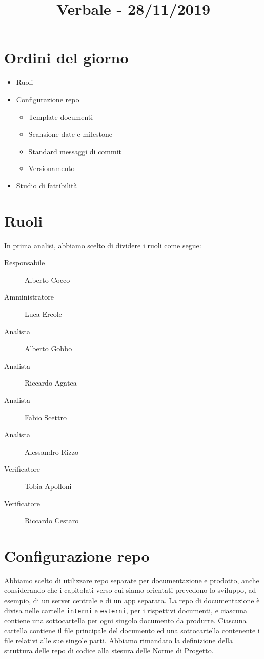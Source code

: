 \documentclass{article}
\title{Verbale - 28/11/2019} %
\newcommand{\commons}{../../commons}
\begin{document}


\section{Ordini del giorno}
\label{sec:ordini_del_giorno}

\begin{itemize}
  \item Ruoli
  \item Configurazione repo
        \begin{itemize}
          \item Template documenti
          \item Scansione date e milestone
          \item Standard messaggi di commit
          \item Versionamento
        \end{itemize}
  \item Studio di fattibilità
\end{itemize}

\section{Ruoli}
\label{sec:ruoli}

In prima analisi, abbiamo scelto di dividere i ruoli come segue:

\begin{description}
  \item[Responsabile] Alberto Cocco
  \item[Amministratore] Luca Ercole
  \item[Analista] Alberto Gobbo
  \item[Analista] Riccardo Agatea
  \item[Analista] Fabio Scettro
  \item[Analista] Alessandro Rizzo
  \item[Verificatore] Tobia Apolloni
  \item[Verificatore] Riccardo Cestaro
\end{description}

\section{Configurazione repo}
\label{sec:configurazione_repo}

Abbiamo scelto di utilizzare repo separate per documentazione e prodotto, anche considerando che i capitolati verso cui siamo orientati prevedono lo sviluppo, ad esempio, di un server centrale e di un app separata.
La repo di documentazione è divisa nelle cartelle \verb|interni| e \verb|esterni|, per i rispettivi documenti, e ciascuna contiene una sottocartella per ogni singolo documento da produrre.
Ciascuna cartella contiene il file principale del documento ed una sottocartella contenente i file relativi alle sue singole parti.
Abbiamo rimandato la definizione della struttura delle repo di codice alla stesura delle Norme di Progetto.
\end{document}
